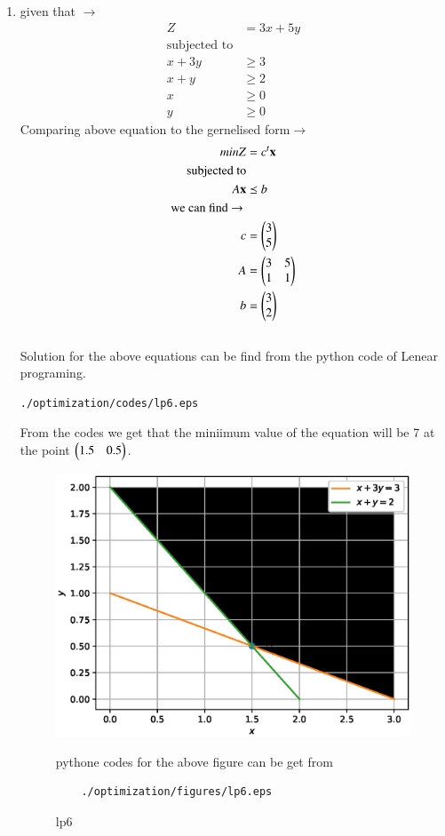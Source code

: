 \renewcommand{\theequation}{\theenumi}
\begin{enumerate}[label=\arabic*.,ref=\thesubsection.\theenumi]
\item  given that $\to$
\begin{align}
Z &= 3x + 5y
\\
\text{subjected to}
\\
x + 3y &\geq 3
\\
x + y &\geq 2
\\
x  &\geq 0
\\
y &\geq 0
\end{align}
Comparing above equation to the gernelised form$\to$ 
\begin{align}
minZ &= c^t \mathbf{x}
\\
\text{subjected to}
\\
A\mathbf{x} &\preceq b
\\ 
\text{we can find $\to$ }
\\
c &= \begin{pmatrix}3\\ 5\end{pmatrix}
\\
A &= \begin{pmatrix}3 & 5 \\ 1 & 1\end{pmatrix}
\\
b &= \begin{pmatrix}3\\2\end{pmatrix}
\end{align}\\
Solution for the above equations can be find from the python code of Lenear programing.\\
\begin{lstlisting}
./optimization/codes/lp6.eps
\end{lstlisting}
From the codes we get that the miniimum value of the equation will be 7 at the point $\begin{pmatrix}1.5 & 0.5\end{pmatrix}$.

\begin{figure}[!ht]
	\centering
	\includegraphics[width=\columnwidth]{./figures/lp6.eps}
	\caption{ lp6}
	\label{fig:lp6}
	pythone codes for the above figure can be get from
	\begin{lstlisting}
	./optimization/figures/lp6.eps
	\end{lstlisting}	
\end{figure}

\end{enumerate}